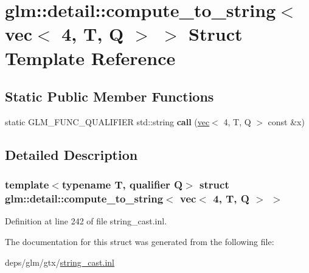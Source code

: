 \hypertarget{structglm_1_1detail_1_1compute__to__string_3_01vec_3_014_00_01T_00_01Q_01_4_01_4}{}\section{glm\+:\+:detail\+:\+:compute\+\_\+to\+\_\+string$<$ vec$<$ 4, T, Q $>$ $>$ Struct Template Reference}
\label{structglm_1_1detail_1_1compute__to__string_3_01vec_3_014_00_01T_00_01Q_01_4_01_4}
\subsection*{Static Public Member Functions}
\begin{DoxyCompactItemize}
\item 
\mbox{\label{structglm_1_1detail_1_1compute__to__string_3_01vec_3_014_00_01T_00_01Q_01_4_01_4_a7ad9df3e448b98637f2fa56c1b20817d}} 
static G\+L\+M\+\_\+\+F\+U\+N\+C\+\_\+\+Q\+U\+A\+L\+I\+F\+I\+ER std\+::string {\bfseries call} (\hyperlink{structglm_1_1vec}{vec}$<$ 4, T, Q $>$ const \&x)
\end{DoxyCompactItemize}


\subsection{Detailed Description}
\subsubsection*{template$<$typename T, qualifier Q$>$\newline
struct glm\+::detail\+::compute\+\_\+to\+\_\+string$<$ vec$<$ 4, T, Q $>$ $>$}



Definition at line 242 of file string\+\_\+cast.\+inl.



The documentation for this struct was generated from the following file\+:\begin{DoxyCompactItemize}
\item 
deps/glm/gtx/\hyperlink{string__cast_8inl}{string\+\_\+cast.\+inl}\end{DoxyCompactItemize}
